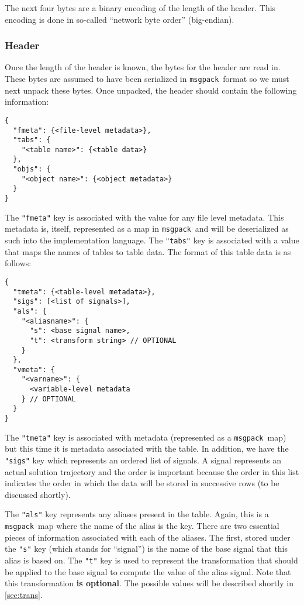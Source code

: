 \documentclass[11pt,a4paper,twocolumn]{article}
\newcommand{\msgpack}{\texttt{msgpack}}
\newcommand{\code}[1]{\texttt{#1}} %
\begin{document}
The next four bytes are a binary encoding of the length of the header.
This encoding is done in so-called ``network byte order''
(big-endian).

\subsubsection{Header}

Once the length of the header is known, the bytes for the header are
read in.  These bytes are assumed to have been serialized in
\msgpack\ format so we must next unpack these bytes.  Once unpacked,
the header should contain the following information:

\begin{verbatim}
{
  "fmeta": {<file-level metadata>},
  "tabs": {
    "<table name>": {<table data>}
  },
  "objs": {
    "<object name>": {<object metadata>}
  }
}
\end{verbatim}

The \code{"fmeta"} key is associated with the value for any file level
metadata.  This metadata is, itself, represented as a map in
\msgpack\ and will be deserialized as such into the implementation
language.  The \code{"tabs"} key is associated with a value that maps
the names of tables to table data.  The format of this table data is
as follows:

\begin{verbatim}
{
  "tmeta": {<table-level metadata>},
  "sigs": [<list of signals>],
  "als": {
    "<aliasname>": {
      "s": <base signal name>,
      "t": <transform string> // OPTIONAL
    }
  },
  "vmeta": {
    "<varname>": {
      <variable-level metadata
    } // OPTIONAL
  }
}
\end{verbatim}

The \code{"tmeta"} key is associated with metadata (represented as a
\msgpack\ map) but this time it is metadata associated with the table.
In addition, we have the \code{"sigs"} key which represents an ordered
list of signals.  A signal represents an actual solution trajectory
and the order is important because the order in this list indicates
the order in which the data will be stored in successive rows (to be
discussed shortly).

The \code{"als"} key represents any aliases present in the table.
Again, this is a \msgpack\ map where the name of the alias is the key.
There are two essential pieces of information associated with each of
the aliases.  The first, stored under the \code{"s"} key (which stands
for ``signal'') is the name of the base signal that this alias is
based on.  The \code{"t"} key is used to represent the transformation
that should be applied to the base signal to compute the value of the
alias signal.  Note that this transformation \textbf{is optional}.
The possible values will be described shortly in \ref{sec:trans}.
\end{document}
